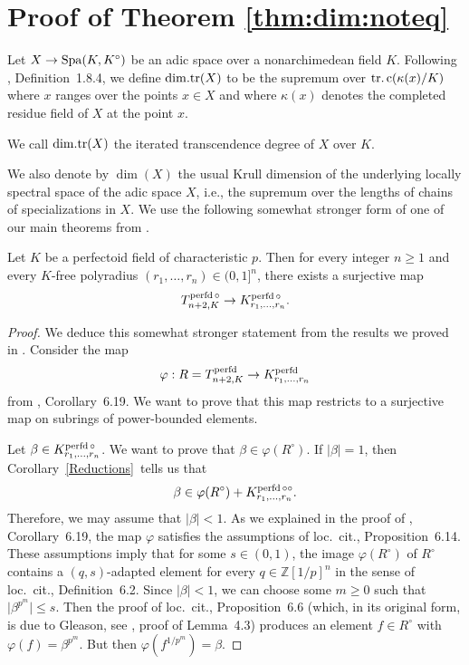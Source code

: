 \section{Proof of Theorem \ref{thm:dim:noteq}}
\label{sec:proof}

Let $X\to \operatorname{Spa}(K, K^{\circ})$ be an adic space over a nonarchimedean field $K$. Following \cite{Huber96}, Definition~1.8.4, we define $\mathrm{dim.tr}(X)$ to be the supremum over $\operatorname{tr.c}(\kappa(x)/K)$ where $x$ ranges over the points $x\in X$ and where $\kappa(x)$ denotes the completed residue field of $X$ at the point $x$. 
\begin{defn}We call $\mathrm{dim.tr}(X)$ the iterated transcendence degree of $X$ over $K$. \end{defn}
We also denote by $\dim(X)$ the usual Krull dimension of the underlying locally spectral space of the adic space $X$, i.e., the supremum over the lengths of chains of specializations in $X$. We use the following somewhat stronger form of one of our main theorems from \cite{Dine-Garzella25}. 
\begin{thm}\label{Old theorem}Let $K$ be a perfectoid field of characteristic $p$. Then for every integer $n\geq1$ and every $K$-free polyradius $(r_1,\dots, r_n)\in (0, 1]^{n}$, there exists a surjective map \begin{equation*}T_{n+2, K}^{\operatorname{perfd}\circ}\to K_{r_1,\dots, r_n}^{\operatorname{perfd}\circ}.\end{equation*}\end{thm}
\begin{proof}We deduce this somewhat stronger statement from the results we proved in \cite{Dine-Garzella25}. Consider the map \begin{equation*}\varphi: R=T_{n+2, K}^{\operatorname{perfd}}\to K_{r_1,\dots, r_n}^{\operatorname{perfd}}\end{equation*}from \cite{Dine-Garzella25}, Corollary~6.19. We want to prove that this map restricts to a surjective map on subrings of power-bounded elements. 

Let $\beta\in K_{r_1,\dots, r_n}^{\operatorname{perfd}\circ}$. We want to prove that $\beta\in \varphi(R^{\circ})$. If $\vert \beta\vert=1$, then Corollary~\ref{Reductions} tells us that \begin{equation*}\beta\in \varphi(R^{\circ})+K_{r_1,\dots, r_n}^{\operatorname{perfd}\circ\circ}.\end{equation*}Therefore, we may assume that $\vert \beta\vert<1$. As we explained in the proof of \cite{Dine-Garzella25}, Corollary~6.19, the map $\varphi$ satisfies the assumptions of loc.~cit., Proposition~6.14. These assumptions imply that for some $s\in (0, 1)$, the image $\varphi(R^{\circ})$ of $R^{\circ}$ contains a $(q, s)$-adapted element for every $q\in \mathbb{Z}[1/p]^{n}$ in the sense of loc.~cit., Definition~6.2. Since $\vert \beta\vert<1$, we can choose some $m\geq0$ such that $\vert \beta^{p^{m}}\vert\leq s$. Then the proof of loc.~cit., Proposition~6.6 (which, in its original form, is due to Gleason, see \cite{gleason-2022-perfectoid-Nullstellensatz}, proof of Lemma~4.3) produces an element $f\in R^{\circ}$ with $\varphi(f)=\beta^{p^{m}}$. But then $\varphi(f^{1/p^{m}})=\beta$. \end{proof}
